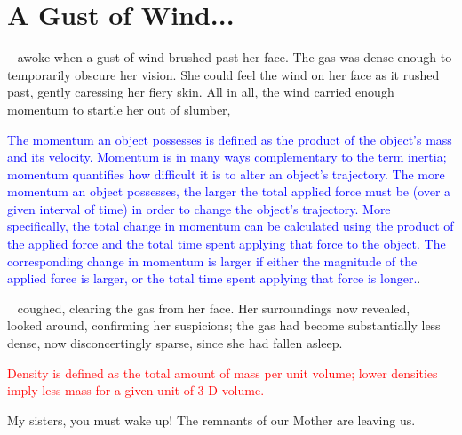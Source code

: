 \documentclass[main.tex]{subfiles}
\begin{document}

\chapter{A Gust of Wind...}

\par \nar \rmsterope~ awoke when a gust of wind brushed past her face.  The gas was dense enough to temporarily obscure her vision.  She could feel the wind on her face as it rushed past, gently caressing her fiery skin.  All in all, the wind carried enough momentum to startle her out of slumber,

\begin{tcolorbox}[sharp corners, colback=blue!30, colframe=blue!80!blue, title=Linear Momentum]
\par \textcolor{blue} {The momentum an object possesses is defined as the product of the object's mass and its velocity.  Momentum is in many ways complementary to the term inertia; momentum quantifies how difficult it is to alter an object's trajectory.  The more momentum an object possesses, the larger the total applied force must be (over a given interval of time) in order to change the object's trajectory.  More specifically, the total change in momentum can be calculated using the product of the applied force and the total time spent applying that force to the object.  The corresponding change in momentum is larger if either the magnitude of the applied force is larger, or the total time spent applying that force is longer.}.  
\end{tcolorbox}

\par \nar \rmsterope~ coughed, clearing the gas from her face.  Her surroundings now revealed, \rmsterope~ looked around, confirming her suspicions; the gas had become substantially less dense, now disconcertingly sparse, since she had fallen asleep. 

\begin{tcolorbox}[sharp corners, colback=red!30, colframe=red!80!blue, title=Mass Density]
\par \textcolor{red} {\nar Density is defined as the total amount of mass per unit volume; lower densities imply less mass for a given unit of 3-D volume.}  
\end{tcolorbox}

\par \Sterope My sisters, you must wake up!  The remnants of our Mother are leaving us.
\end{document}
